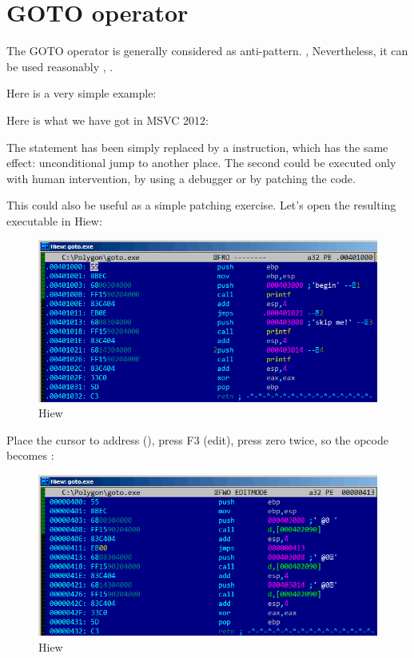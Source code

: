 \chapter{GOTO operator}

The GOTO operator is generally considered as anti-pattern. 
\cite{Dijkstra:1968:LEG:362929.362947}, 
Nevertheless, it can be used reasonably \cite{Knuth:1974:SPG:356635.356640}, \cite[1.3.2]{CBook}.

Here is a very simple example:



Here is what we have got in MSVC 2012:



The  statement has been simply replaced by a \JMP instruction, which has the same effect: unconditional jump to another place.
The second \printf could be executed only with human intervention, by using a debugger or by patching the code.

\par

\clearpage

This could also be useful as a simple patching exercise. Let's open the resulting executable in Hiew:

\begin{figure}[H]
\centering
\includegraphics[scale=\FigScale]{patterns/065_GOTO/hiew1.png}
\caption{Hiew}
\label{fig:goto_hiew1}
\end{figure}

\clearpage
Place the cursor to address \JMP (), 
press F3 (edit), press zero twice, so the opcode becomes :

\begin{figure}[H]
\centering
\includegraphics[scale=\FigScale]{patterns/065_GOTO/hiew2.png}
\caption{Hiew}
\label{fig:goto_hiew2}
\end{figure}

